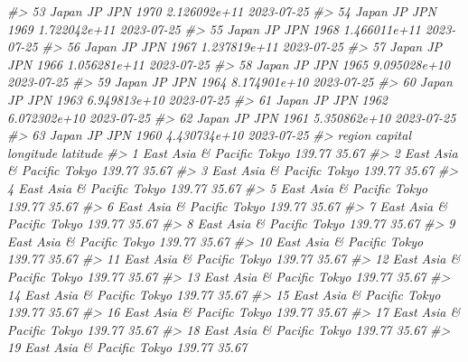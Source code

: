\documentclass[
  xelatex, ja=standard]{bxjsbook}
\newenvironment{Shaded}{\begin{snugshade}}{\end{snugshade}}
\newcommand{\CommentTok}[1]{\textcolor[rgb]{0.56,0.35,0.01}{\textit{#1}}}
\theoremstyle{definition}
\theoremstyle{definition}
\theoremstyle{definition}
\theoremstyle{definition}
\theoremstyle{remark}
\begin{document}
\begin{Shaded}
\begin{Highlighting}[]
\CommentTok{\#\textgreater{} 53   Japan    JP   JPN 1970 2.126092e+11         2023{-}07{-}25}
\CommentTok{\#\textgreater{} 54   Japan    JP   JPN 1969 1.722042e+11         2023{-}07{-}25}
\CommentTok{\#\textgreater{} 55   Japan    JP   JPN 1968 1.466011e+11         2023{-}07{-}25}
\CommentTok{\#\textgreater{} 56   Japan    JP   JPN 1967 1.237819e+11         2023{-}07{-}25}
\CommentTok{\#\textgreater{} 57   Japan    JP   JPN 1966 1.056281e+11         2023{-}07{-}25}
\CommentTok{\#\textgreater{} 58   Japan    JP   JPN 1965 9.095028e+10         2023{-}07{-}25}
\CommentTok{\#\textgreater{} 59   Japan    JP   JPN 1964 8.174901e+10         2023{-}07{-}25}
\CommentTok{\#\textgreater{} 60   Japan    JP   JPN 1963 6.949813e+10         2023{-}07{-}25}
\CommentTok{\#\textgreater{} 61   Japan    JP   JPN 1962 6.072302e+10         2023{-}07{-}25}
\CommentTok{\#\textgreater{} 62   Japan    JP   JPN 1961 5.350862e+10         2023{-}07{-}25}
\CommentTok{\#\textgreater{} 63   Japan    JP   JPN 1960 4.430734e+10         2023{-}07{-}25}
\CommentTok{\#\textgreater{}                 region capital longitude latitude}
\CommentTok{\#\textgreater{} 1  East Asia \& Pacific   Tokyo    139.77    35.67}
\CommentTok{\#\textgreater{} 2  East Asia \& Pacific   Tokyo    139.77    35.67}
\CommentTok{\#\textgreater{} 3  East Asia \& Pacific   Tokyo    139.77    35.67}
\CommentTok{\#\textgreater{} 4  East Asia \& Pacific   Tokyo    139.77    35.67}
\CommentTok{\#\textgreater{} 5  East Asia \& Pacific   Tokyo    139.77    35.67}
\CommentTok{\#\textgreater{} 6  East Asia \& Pacific   Tokyo    139.77    35.67}
\CommentTok{\#\textgreater{} 7  East Asia \& Pacific   Tokyo    139.77    35.67}
\CommentTok{\#\textgreater{} 8  East Asia \& Pacific   Tokyo    139.77    35.67}
\CommentTok{\#\textgreater{} 9  East Asia \& Pacific   Tokyo    139.77    35.67}
\CommentTok{\#\textgreater{} 10 East Asia \& Pacific   Tokyo    139.77    35.67}
\CommentTok{\#\textgreater{} 11 East Asia \& Pacific   Tokyo    139.77    35.67}
\CommentTok{\#\textgreater{} 12 East Asia \& Pacific   Tokyo    139.77    35.67}
\CommentTok{\#\textgreater{} 13 East Asia \& Pacific   Tokyo    139.77    35.67}
\CommentTok{\#\textgreater{} 14 East Asia \& Pacific   Tokyo    139.77    35.67}
\CommentTok{\#\textgreater{} 15 East Asia \& Pacific   Tokyo    139.77    35.67}
\CommentTok{\#\textgreater{} 16 East Asia \& Pacific   Tokyo    139.77    35.67}
\CommentTok{\#\textgreater{} 17 East Asia \& Pacific   Tokyo    139.77    35.67}
\CommentTok{\#\textgreater{} 18 East Asia \& Pacific   Tokyo    139.77    35.67}
\CommentTok{\#\textgreater{} 19 East Asia \& Pacific   Tokyo    139.77    35.67}

\end{Highlighting}
\end{Shaded}
\end{document}
